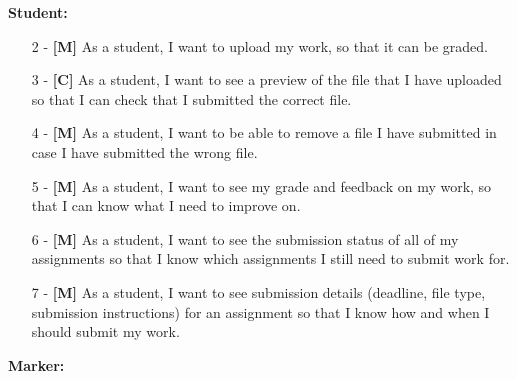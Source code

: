 \documentclass{l4proj}
\begin{document}
\textbf{Student:}
\begin{itemize}
    \item
        [2] - \textbf{[M]} As a student, I want to upload my work, so that it can be graded.
    \item
        [3] - \textbf{[C]} As a student, I want to see a preview of the file that I have uploaded so that I can check that I submitted the correct file.
    \item
        [4] - \textbf{[M]} As a student, I want to be able to remove a file I have submitted in case I have submitted the wrong file.
    \item
        [5] - \textbf{[M]} As a student, I want to see my grade and feedback on my work, so that I can know what I need to improve on.
    \item
        [6] - \textbf{[M]} As a student, I want to see the submission status of all of my assignments so that I know which assignments I still need to submit work for.
    \item
        [7] - \textbf{[M]} As a student, I want to see submission details (deadline, file type, submission instructions) for an assignment so that I know how and when I should submit my work.
    
\end{itemize}
\textbf{Marker:}
\end{document}
